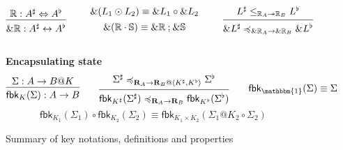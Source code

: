 \documentclass[acmsmall,screen,review,anonymous]{acmart}
\newcommand{\kw}[1]{\ensuremath{ \mathsf{#1} }}
\renewcommand{\preceq}{\preccurlyeq}
\begin{document}
\begin{figure}[h]
\[    \begin{prooftree}
      \hypo{\mathbb{R} : A^\sharp \Leftrightarrow A^\flat}
      \infer1{\&\mathbb{R} : A^\sharp \leftrightarrow A^\flat}
    \end{prooftree}
    \qquad
    \begin{array}{c}
      \&(L_1 \odot L_2) \equiv \&L_1 \circ \&L_2
      \\[1ex]
      \&(\mathbb{R} \cdot \mathbb{S}) \equiv
        \&\mathbb{R} \mathbin; \&\mathbb{S}
    \end{array}
    \qquad
    \begin{prooftree}
      \hypo{L^\sharp
        \le_{\mathbb{R}_A \twoheadrightarrow \mathbb{R}_B}
        L^\flat}
      \infer1{\&L^\sharp
        \preceq_{\&\mathbb{R}_A \rightarrow \&\mathbb{R}_B}
        \&L^\flat}
    \end{prooftree}
  \]
  \\[1em]
  \textbf{Encapsulating state}
  \[
    \begin{prooftree}
      \hypo{\Sigma : A \rightarrow B@K}
      \infer1{\kw{fbk}_K(\Sigma) : A \rightarrow B}
    \end{prooftree}
    \qquad
    \begin{prooftree}
      \hypo{\Sigma^\sharp
        \preceq_{\mathbf{R}_A \rightarrow
                 \mathbf{R}_B@\langle K^\sharp,K^\flat \rangle}
        \Sigma^\flat}
      \infer1{\kw{fbk}_{K^\sharp}(\Sigma^\sharp)
        \preceq_{\mathbf{R}_A \rightarrow \mathbf{R}_B}
        \kw{fbk}_{K^\flat}(\Sigma^\flat)}
    \end{prooftree}
    \qquad
    \kw{fbk}_\mathbbm{1}(\Sigma) \equiv \Sigma
  \]
  \vspace{1ex}
  \[
    \kw{fbk}_{K_1}(\Sigma_1) \circ \kw{fbk}_{K_2}(\Sigma_2) \equiv
    \kw{fbk}_{K_1 \times K_2}(\Sigma_1@K_2 \circ \Sigma_2)
  \]
  \caption{Summary of key notations, definitions and properties}
  \label{fig:overview}
\end{figure}

\tableofcontents
\end{document}
